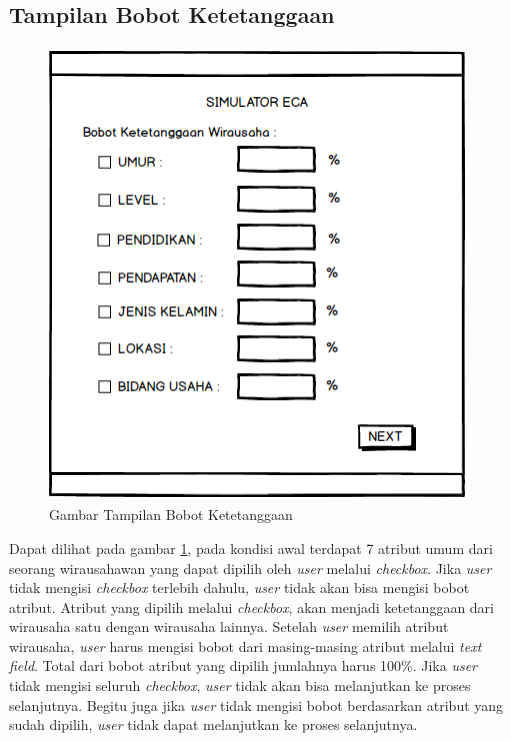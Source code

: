 \subsection{Tampilan Bobot Ketetanggaan}

\begin{figure} [H]
	\centering  
	\includegraphics[width=11cm, height=12cm]{mockup1} 
	\caption[Gambar Tampilan Bobot Ketetanggaan]{Gambar Tampilan Bobot Ketetanggaan}
	\label{fig:kondisiInternal} 
\end{figure}

Dapat dilihat pada gambar \ref{fig:kondisiInternal}, pada kondisi awal terdapat 7 atribut umum dari seorang wirausahawan yang dapat dipilih oleh \textit{user} melalui \textit{checkbox}. Jika \textit{user} tidak mengisi \textit{checkbox} terlebih dahulu, \textit{user} tidak akan bisa mengisi bobot atribut. Atribut yang dipilih melalui \textit{checkbox}, akan menjadi ketetanggaan dari wirausaha satu dengan wirausaha lainnya. Setelah \textit{user} memilih atribut wirausaha, \textit{user} harus mengisi bobot dari masing-masing atribut melalui \textit{text field}. Total dari bobot atribut yang dipilih jumlahnya harus 100\%. Jika \textit{user} tidak mengisi seluruh  \textit{checkbox}, \textit{user} tidak akan bisa melanjutkan ke proses selanjutnya. Begitu juga jika \textit{user} tidak mengisi bobot berdasarkan atribut yang sudah dipilih, \textit{user} tidak dapat melanjutkan ke proses selanjutnya.

